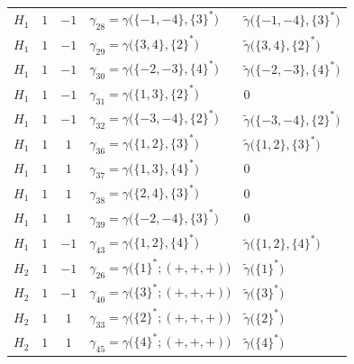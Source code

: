 \documentclass{amsart}
\theoremstyle{definition}
\newcommand{\tu}{\widetilde}
\begin{document}
\begin{longtable}{
@{}
c
c
c
>{\raggedright\arraybackslash}p{}
>{\raggedright\arraybackslash}p{}
@{}
}
\(H_1\)
&
\(1\)
&
\(-1\)
&
\(\gamma_{28}=\gamma\bigl(\{-1,-4\},\{3\}^*\bigr)\)
&
\(\tu\gamma\bigl(\{-1,-4\},\{3\}^*\bigr)\)
\\

\(H_1\)
&
\(1\)
&
\(-1\)
&
\(\gamma_{29}=\gamma\bigl(\{3,4\},\{2\}^*\bigr)\)
&
\(\tu\gamma\bigl(\{3,4\},\{2\}^*\bigr)\)
\\

\(H_1\)
&
\(1\)
&
\(-1\)
&
\(\gamma_{30}=\gamma\bigl(\{-2,-3\},\{4\}^*\bigr)\)
&
\(\tu\gamma\bigl(\{-2,-3\},\{4\}^*\bigr)\)
\\

\(H_1\)
&
\(1\)
&
\(-1\)
&
\(\gamma_{31}=\gamma\bigl(\{1,3\},\{2\}^*\bigr)\)
&
\(0\)
\\

\(H_1\)
&
\(1\)
&
\(-1\)
&
\(\gamma_{32}=\gamma\bigl(\{-3,-4\},\{2\}^*\bigr)\)
&
\(\tu\gamma\bigl(\{-3,-4\},\{2\}^*\bigr)\)
\\
\addlinespace

\(H_1\)
&
\(1\)
&
\(1\)
&
\(\gamma_{36}=\gamma\bigl(\{1,2\},\{3\}^*\bigr)\)
&
\(\tu\gamma\bigl(\{1,2\},\{3\}^*\bigr)\)
\\

\(H_1\)
&
\(1\)
&
\(1\)
&
\(\gamma_{37}=\gamma\bigl(\{1,3\},\{4\}^*\bigr)\)
&
\(0\)
\\

\(H_1\)
&
\(1\)
&
\(1\)
&
\(\gamma_{38}=\gamma\bigl(\{2,4\},\{3\}^*\bigr)\)
&
\(0\)
\\

\(H_1\)
&
\(1\)
&
\(1\)
&
\(\gamma_{39}=\gamma\bigl(\{-2,-4\},\{3\}^*\bigr)\)
&
\(0\)
\\
\addlinespace

\(H_1\)
&
\(1\)
&
\(-1\)
&
\(\gamma_{43}=\gamma\bigl(\{1,2\},\{4\}^*\bigr)\)
&
\(\tu\gamma\bigl(\{1,2\},\{4\}^*\bigr)\)
\\

\midrule

\(H_2\)
&
\(1\)
&
\(-1\)
&
\(\gamma_{26}=\gamma\bigl(\{1\}^*;(+,+,+)\bigr)\)
&
\(\tu\gamma\bigl(\{1\}^*\bigr)\)
\\

\(H_2\)
&
\(1\)
&
\(-1\)
&
\(\gamma_{40}=\gamma\bigl(\{3\}^*;(+,+,+)\bigr)\)
&
\(\tu\gamma\bigl(\{3\}^*\bigr)\)
\\

\(H_2\)
&
\(1\)
&
\(1\)
&
\(\gamma_{33}=\gamma\bigl(\{2\}^*;(+,+,+)\bigr)\)
&
\(\tu\gamma\bigl(\{2\}^*\bigr)\)
\\

\(H_2\)
&
\(1\)
&
\(1\)
&
\(\gamma_{45}=\gamma\bigl(\{4\}^*;(+,+,+)\bigr)\)
&
\(\tu\gamma\bigl(\{4\}^*\bigr)\)
\\

\end{longtable}
\end{document}

